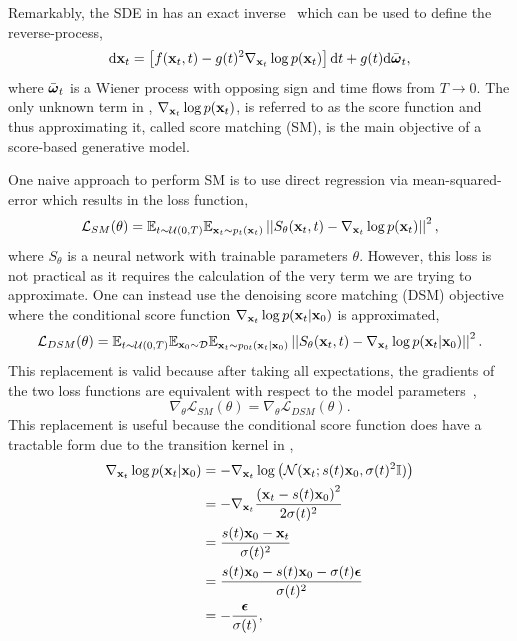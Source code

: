 Remarkably, the SDE in  has an exact inverse~\cite{ReversetimeDiffusionEquation} which can be used to define the reverse-process,
\begin{equation}
    \label{eq:reverse_sde}
    \mathrm{d} \mathbf{x}_t = \left[ f(\mathbf{x}_t, t) - g(t)^2 \nabla_{\mathbf{x}_t} \log p(\mathbf{x}_t) \right] \mathrm{d} t + g(t) \mathrm{d} \bar{\boldsymbol{\omega}}_t,
\end{equation}
where $\bar{\boldsymbol{\omega}}_t$ is a Wiener process with opposing sign and time flows from $T \rightarrow 0$.
The only unknown term in , $\nabla_{\mathbf{x}_t} \log p(\mathbf{x}_t)$, is referred to as the score function and thus approximating it, called score matching (SM), is the main objective of a score-based generative model.

One naive approach to perform SM is to use direct regression via mean-squared-error which results in the loss function,
\begin{equation}
    \label{eq:naive_loss}
    \mathcal{L}_{SM}(\theta) =
    \mathbb{E}_{t \sim \mathcal{U}(0, T)}
    \mathbb{E}_{\mathbf{x}_t \sim p_t(\mathbf{x}_t)}
    \left|\left|S_\theta(\mathbf{x}_t, t) - \nabla_{\mathbf{x}_t} \log p(\mathbf{x}_t)\right|\right|^2,
\end{equation}
where $S_\theta$ is a neural network with trainable parameters $\theta$.
However, this loss is not practical as it requires the calculation of the very term we are trying to approximate.
One can instead use the denoising score matching (DSM) objective~\cite{ScoreMatching, SlicedScoreMatching} where the conditional score function $\nabla_{\mathbf{x}_t} \log p(\mathbf{x}_t|\mathbf{x}_0)$ is approximated,
\begin{equation}
    \label{eq:denoising_loss}
    \mathcal{L}_{DSM}(\theta) =
    \mathbb{E}_{t \sim \mathcal{U}(0, T)}
    \mathbb{E}_{\mathbf{x}_0 \sim \mathcal{D}}
    \mathbb{E}_{\mathbf{x}_t \sim p_{0t}(\mathbf{x}_t|\mathbf{x}_0)}
    \left|\left|S_\theta(\mathbf{x}_t, t) - \nabla_{\mathbf{x}_t} \log p(\mathbf{x}_t|\mathbf{x}_0)\right|\right|^2.
\end{equation}
This replacement is valid because after taking all expectations, the gradients of the two loss functions are equivalent with respect to the model parameters~\cite{ScoreBasedGenerativeModeling},
\begin{equation}
    \nabla_{\theta} \mathcal{L}_{SM}(\theta) = \nabla_{\theta} \mathcal{L}_{DSM}(\theta).
\end{equation}
This replacement is useful because the conditional score function does have a tractable form due to the transition kernel in ,
\begin{equation}
    \begin{aligned}
        \label{eq:conditional_score}
        \nabla_{\mathbf{x}_t} \log p(\mathbf{x}_t|\mathbf{x}_0)
        &= -\nabla_{\mathbf{x}_t} \log \left( \mathcal{N}(\mathbf{x}_t; s(t)\mathbf{x}_0, \sigma(t)^2 \mathbb{I}) \right) \\
        &= -\nabla_{\mathbf{x}_t} \frac{\left(\mathbf{x}_t - s(t)\mathbf{x}_0\right)^2}{2\sigma(t)^2} \\
        &= \frac{s(t)\mathbf{x}_0 - \mathbf{x}_t}{\sigma(t)^2} \\
        &= \frac{s(t)\mathbf{x}_0 - s(t)\mathbf{x}_0 - \sigma(t)\boldsymbol{\epsilon}}{\sigma(t)^2} \\
        &= - \frac{\boldsymbol{\epsilon}}{\sigma(t)},
    \end{aligned}
\end{equation}
